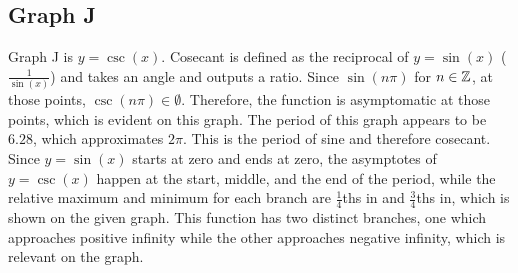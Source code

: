 \subsection{Graph J}

Graph J is ${y=\csc(x)}$.
Cosecant is defined as the reciprocal of ${y=\sin(x)}$ (${\frac{1}{\sin(x)}}$) and takes an angle and outputs a ratio.
Since ${\sin(n\pi)}$ for ${n \in \mathbb{Z}}$, at those points, ${{\csc(n\pi)} \in \emptyset}$.
Therefore, the function is asymptomatic at those points, which is evident on this graph.
The period of this graph appears to be ${6.28}$, which approximates ${2\pi}$.
This is the period of sine and therefore cosecant.
Since ${y=\sin(x)}$ starts at zero and ends at zero, the asymptotes of ${y = \csc(x)}$ happen at the start, middle, and the end of the period, while the relative maximum and minimum for each branch are ${\frac{1}{4}}$ths in and ${\frac{3}{4}}$ths in, which is shown on the given graph.
This function has two distinct branches, one which approaches positive infinity while the other approaches negative infinity, which is relevant on the graph.
